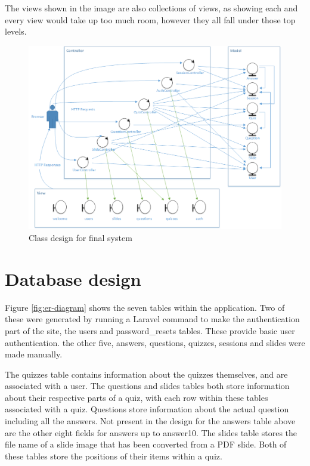 The views shown in the image are also collections of views, as showing each and every view would take up too much room, however they all fall under those top levels.

\begin{figure}
	\caption{Class design for final system}
	\centerline{\includegraphics{Chapter3/overall-class-design}}
	\label{fig:overall-class-design}
\end{figure}

\newpage
\section{Database design}
Figure \ref{fig:er-diagram} shows the seven tables within the application. Two of these were generated by running a Laravel command to make the authentication part of the site, the users and password\_resets tables. These provide basic user authentication. the other five, answers, questions, quizzes, sessions and slides were made manually.

The quizzes table contains information about the quizzes themselves, and are associated with a user. The questions and slides tables both store information about their respective parts of a quiz, with each row within these tables associated with a quiz. Questions store information about the actual question including all the answers. Not present in the design  for the answers table above are the other eight fields for answers up to answer10. The slides table stores the file name of a slide image that has been converted from a PDF slide. Both of these tables store the positions of their items within a quiz.

